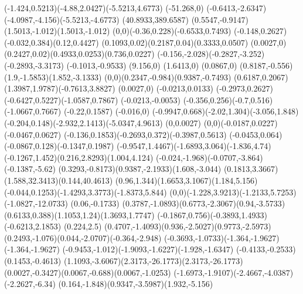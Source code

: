 {    \rcurveto(-1.424,0.5213)(-4.88,2.0427)(-5.5213,4.6773)
    \rlineto(-51.268,0)
    \rcurveto(-0.6413,-2.6347)(-4.0987,-4.156)(-5.5213,-4.6773)
    \closepath
    \moveto(40.8933,389.6587)
    \rcurveto(0.5547,-0.9147)(1.5013,-1.012)(1.5013,-1.012)
    \rcurveto(0,0)(-0.36,0.228)(-0.6533,0.7493)
    \rcurveto(-0.148,0.2627)(-0.032,0.384)(0.12,0.4427)
    \rcurveto(0.1093,0.02)(0.2187,0.04)(0.3333,0.0507)
    \rlineto(0.0027,0)
    \rcurveto(0.2427,0.02)(0.4933,0.0253)(0.736,0.0227)
    \rcurveto(-0.156,-2.028)(-0.2827,-3.252)(-0.2893,-3.3173)
    \rlineto(-0.1013,-0.9533)
    \rlineto(9.156,0)
    \rlineto(1.6413,0)
    \rlineto(0.0867,0)
    \rcurveto(0.8187,-0.556)(1.9,-1.5853)(1.852,-3.1333)
    \rcurveto(0,0)(0.2347,-0.984)(0.9387,-0.7493)
    \rcurveto(0.6187,0.2067)(1.3987,1.9787)(-0.7613,3.8827)
    \rlineto(0.0027,0)
    \rlineto(-0.0213,0.0133)
    \rcurveto(-0.2973,0.2627)(-0.6427,0.5227)(-1.0587,0.7867)
    \rlineto(-0.0213,-0.0053)
    \rcurveto(-0.356,0.256)(-0.7,0.516)(-1.0667,0.7667)
    \rlineto(-0.22,0.1587)
    \rlineto(-0.016,0)
    \rcurveto(-0.9947,0.668)(-2.02,1.304)(-3.056,1.848)
    \rcurveto(-0.204,0.148)(-2.932,2.1413)(-5.0347,4.9613)
    \rlineto(0,0.0027)
    \rcurveto(0,0)(-0.0187,0.0227)(-0.0467,0.0627)
    \rcurveto(-0.136,0.1853)(-0.2693,0.372)(-0.3987,0.5613)
    \rcurveto(-0.0453,0.064)(-0.0867,0.128)(-0.1347,0.1987)
    \rcurveto(-0.9547,1.4467)(-1.6893,3.064)(-1.836,4.74)
    \rcurveto(-0.1267,1.452)(0.216,2.8293)(1.004,4.124)
    \rcurveto(-0.024,-1.968)(-0.0707,-3.864)(-0.1387,-5.62)
    \rcurveto(0.3293,-0.8173)(0.9387,-2.1933)(1.608,-3.044)
    \rcurveto(0.1813,3.3667)(1.588,32.3413)(0.144,40.4613)
    \rcurveto(0.96,1.344)(1.6653,3.1067)(1.184,5.156)
    \rcurveto(-0.044,0.1253)(-1.4293,3.3773)(-1.8373,5.844)
    \rcurveto(0,0)(-1.228,3.9213)(-1.2133,5.7253)
    \rlineto(-1.0827,-12.0733)
    \rlineto(0.06,-0.1733)
    \rcurveto(0.3787,-1.0893)(0.6773,-2.3067)(0.94,-3.5733)
    \rcurveto(0.6133,0.388)(1.1053,1.24)(1.3693,1.7747)
    \rcurveto(-0.1867,0.756)(-0.3893,1.4933)(-0.6213,2.1853)
    \rlineto(0.224,2.5)
    \rcurveto(0.4707,-1.4093)(0.936,-2.5027)(0.9773,-2.5973)
    \rcurveto(0.2493,-1.076)(0.044,-2.0707)(-0.364,-2.948)
    \rcurveto(-0.3693,-1.0733)(-1.364,-1.9627)(-1.364,-1.9627)
    \rcurveto(-0.9453,-1.012)(-1.9093,-1.6227)(-1.928,-1.6347)
    \rlineto(-0.4133,-0.2533)
    \rlineto(0.1453,-0.4613)
    \rcurveto(1.1093,-3.6067)(2.3173,-26.1773)(2.3173,-26.1773)
    \rcurveto(0.0027,-0.3427)(0.0067,-0.688)(0.0067,-1.0253)
    \rcurveto(-1.6973,-1.9107)(-2.4667,-4.0387)(-2.2627,-6.34)
    \rcurveto(0.164,-1.848)(0.9347,-3.5987)(1.932,-5.156)
}
